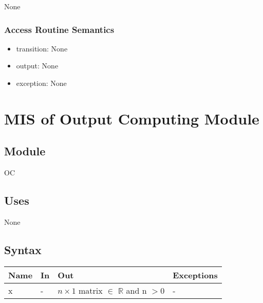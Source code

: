 \documentclass[12pt, titlepage]{article}
\begin{document}
None


\subsubsection{Access Routine Semantics}

\noindent %
\begin{itemize}
\item transition: None %
\item output: None %
\item exception: None %
\end{itemize}


\newpage


\section{MIS of {Output Computing Module}} \label{modoc} %

\subsection{Module}

OC


\subsection{Uses}

None

\subsection{Syntax}

\begin{center}
\begin{tabular}{p{2cm} p{4cm} p{4cm} p{2cm}}
\hline
\textbf{Name} & \textbf{In} & \textbf{Out} & \textbf{Exceptions} \\
\hline


x & - & $n \times 1$ matrix $\in$ $\mathbb{R}$ and n $> 0$ & - \\
\hline
\end{tabular}
\end{center}
\end{document}
